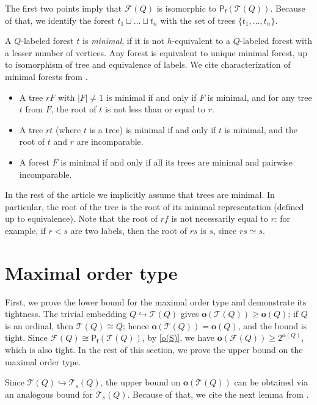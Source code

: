 \documentclass[10pt,a4paper]{amsart}
\let \geq \geqslant
\let \embeds \hookrightarrow
\renewcommand \S [1][]{\mathsf{P_f^{#1}}}
\def \T {\mathcal{T}}
\def \F {\mathcal{F}}
\def \o {\textbf{o}}
\begin{document}
The first two points imply that $\F(Q)$ is isomorphic to $\S(\T(Q))$. Because of that, we identify the forest $t_1 \sqcup \dots \sqcup t_n$ with the set of trees $\{t_1, \dots, t_n\}$.

A $Q$-labeled forest $t$ is \textit{minimal}, if it is not $h$-equivalent to a $Q$-labeled forest with a lesser number of vertices. Any forest is equivalent to unique minimal forest, up to isomorphism of tree and equivalence of labels. We cite characterization of minimal forests from \cite{Selivanov2011}.
\begin{itemize}
    \item A tree $rF$ with $|F| \neq 1$ is minimal if and only if $F$ is minimal, and for any tree $t$ from $F$, the root of $t$ is not less than or equal to $r$.
    \item A tree $rt$ (where $t$ is a tree) is minimal if and only if $t$ is minimal, and the root of $t$ and $r$ are incomparable.
    \item A forest $F$ is minimal if and only if all its trees are minimal and pairwise incomparable.
\end{itemize}

In the rest of the article we implicitly assume that trees are minimal. In particular, the root of the tree is the root of its minimal representation (defined up to equivalence). Note that the root of $rf$ is not necessarily equal to $r$: for example, if $r < s$ are two labels, then the root of $rs$ is $s$, since $rs \simeq s$.





\section{Maximal order type}\label{section o}

First, we prove the lower bound for the maximal order type and demonstrate its tightness.
The trivial embedding $Q \embeds \T(Q)$ gives $\o(\T(Q)) \geq \o(Q)$; if $Q$ is an ordinal, then $\T(Q) \cong Q$; hence $\o(\T(Q)) = \o(Q)$, and the bound is tight. Since $\F(Q) \cong \S(\T(Q))$, by \cref{o(S)}, we have $\o(\F(Q)) \geq 2^{\o(Q)}$, which is also tight. In the rest of this section, we prove the upper bound on the maximal order type.

Since $\T(Q) \embeds \T_s(Q)$, the upper bound on $\o(\T(Q))$ can be obtained via an analogous bound for $\T_s(Q)$. Because of that, we cite the next lemma from \cite{Friedman2023}.
\end{document}
